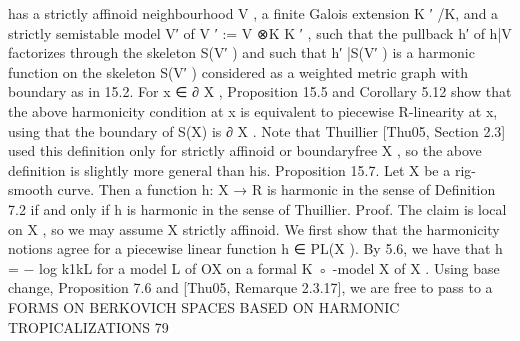 \documentclass[
  10pt,
]{article}
\newenvironment{Shaded}{}{}
\newcommand{\NormalTok}[1]{#1}
\begin{document}
\begin{Shaded}
\begin{Highlighting}[]
\NormalTok{has a strictly affinoid neighbourhood V , a finite Galois extension K ′ /K, and a strictly}
\NormalTok{semistable model V′ of V ′ := V ⊗K K ′ , such that the pullback h′ of h|V factorizes through}
\NormalTok{the skeleton S(V′ ) and such that h′ |S(V′ ) is a harmonic function on the skeleton S(V′ )}
\NormalTok{considered as a weighted metric graph with boundary as in 15.2.}
\NormalTok{   For x ∈ ∂ X , Proposition 15.5 and Corollary 5.12 show that the above harmonicity}
\NormalTok{condition at x is equivalent to piecewise R{-}linearity at x, using that the boundary of}
\NormalTok{S(X) is ∂ X . Note that Thuillier [Thu05, Section 2.3] used this definition only for strictly}
\NormalTok{affinoid or boundaryfree X , so the above definition is slightly more general than his.}
\NormalTok{Proposition 15.7. Let X be a rig{-}smooth curve. Then a function h: X → R is harmonic in}
\NormalTok{the sense of Definition 7.2 if and only if h is harmonic in the sense of Thuillier.}
\NormalTok{Proof. The claim is local on X , so we may assume X strictly affinoid. We first show}
\NormalTok{that the harmonicity notions agree for a piecewise linear function h ∈ PL(X ). By 5.6,}
\NormalTok{we have that h = − log k1kL for a model L of OX on a formal K ◦ {-}model X of X . Using}
\NormalTok{base change, Proposition 7.6 and [Thu05, Remarque 2.3.17], we are free to pass to a}
\NormalTok{              FORMS ON BERKOVICH SPACES BASED ON HARMONIC TROPICALIZATIONS                79}


\end{Highlighting}
\end{Shaded}
\end{document}
